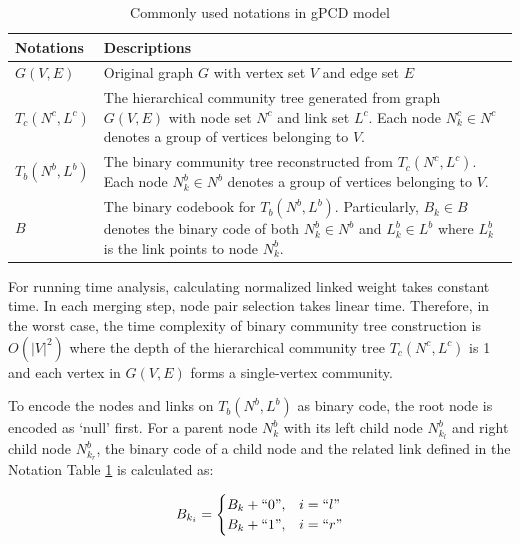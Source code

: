 \begin{table}[h]
	\centering
	
	\begin{tabular}{|p{3cm}|p{11cm}|} 
		\hline
		\textbf{Notations} & \textbf{Descriptions} \\ \hline
		$G(V,E)$ & Original graph $G$ with vertex set $V$ and edge set $E$ \\ \hline
		\textit{$T_{c}(N^{c},L^{c})$} & The hierarchical community tree generated from graph $G(V,E)$ with node set $N^{c}$ and link set $L^{c}$. Each node  $N^{c}_{k} \in N^{c}$ denotes a group of vertices belonging to $V$. \\\hline
		\textit{$T_{b}(N^{b},L^{b})$} & The binary community tree reconstructed from \textit{$T_{c}(N^{c},L^{c})$}. Each node $N^{b}_{k} \in N^{b}$ denotes a group of vertices belonging to $V$. \\ \hline
		$B$ & The binary codebook for \textit{$T_{b}(N^{b},L^{b})$}. Particularly, $B_{k} \in B$ denotes the binary code of both $N_{k}^{b} \in N^{b}$ and $L_{k}^{b}\in L^{b}$ where $L_{k}^{b}$ is the link points to node $N_{k}^{b}$.
		\\ \hline
	\end{tabular}
	\caption{Commonly used notations in gPCD model}
	\label{tab:notation}
	\vspace{-1em}
\end{table} 


For running time analysis, calculating normalized linked weight takes constant time. In each merging step, node pair selection takes linear time. Therefore, in the worst case, the time complexity of binary community tree construction is $O(|V|^2)$ where the depth of the hierarchical community tree $T_{c}(N^{c},L^{c})$ is 1 and each vertex in $G(V,E)$ forms a single-vertex community.

To encode the nodes and links on $T_{b}(N^{b},L^{b})$ as binary code, the root node is encoded as `null' first. For a parent node \textit{$N_{k}^{b}$} with its left child node \textit{$N^{b}_{k_{l}}$} and right child node \textit{$N^{b}_{k_{r}}$}, the binary code of a child node and the related link defined in the Notation Table \ref{tab:notation} is calculated as: 

\begin{eqnarray}\text{$B_{k_{i}}$}=
\begin{cases}
\text{$B_{k}$}+``0", & i = ``l"\cr 
\text{$B_{k}$}+``1", & i = ``r"
\end{cases}
\end{eqnarray} 

